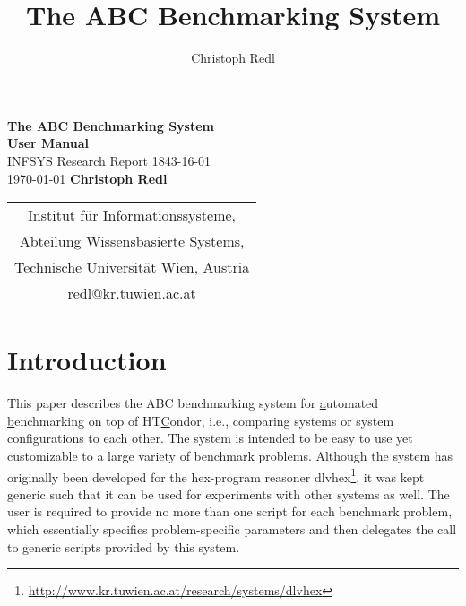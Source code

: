 \documentclass[a4paper]{article}
\newcommand{\dlvhex}{{\sc dlvhex}}
\newcommand{\hex}{{\sc hex}}
\newcommand{\abcs}{{ABC}}
\begin{document}
	
	\title{The \abcs{} Benchmarking System}
	\author{Christoph Redl}


\begin{titlepage}
    \centering
    \vfill
    \vskip2cm
        {\bfseries\Huge The \abcs{} Benchmarking System} \\[1em]
        {\bfseries\Huge User Manual} \\
        \vskip3.0cm
        {\sc\Large INFSYS Research Report 1843-16-01} \\
        \medskip
        {\Large \today}        
        \vskip2cm
        {\bfseries\Large
        Christoph Redl \\
        }    
        \vspace{1cm}
        \begin{tabular}{c}
        {\Large}
          Institut f\"ur Informationssysteme,\\
          Abteilung Wissensbasierte Systems,\\
          Technische Universit\"at Wien, Austria \\
          {redl@kr.tuwien.ac.at} \\[1ex]
        \end{tabular}
        \vspace{4cm}
	\restoregeometry
\end{titlepage}
	
	\section{Introduction}
	\label{sec:introduction}

		This paper describes the \abcs{} benchmarking system
		for \uline{a}utomated \uline{b}enchmarking on top of HT\uline{C}ondor, i.e.,
		comparing systems or system configurations to each other.
		The system is intended to be easy to use yet customizable to a large variety of
		benchmark problems.
		Although the system has originally been developed for the \hex-program reasoner \dlvhex{}\footnote{\url{http://www.kr.tuwien.ac.at/research/systems/dlvhex}},
		it was kept generic such that it can be used for experiments with other systems as well.
		The user is required to provide no more than one script for each benchmark problem,
		which essentially specifies problem-specific parameters and then delegates the call
		to generic scripts provided by this system.
		
\end{document}
